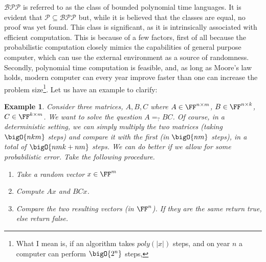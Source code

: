 \documentclass{article}
\newtheorem{example}{Example}
\begin{document}
$\mathcal{BPP}$ is referred to as the class of bounded polynomial time languages. It is evident that $\mathcal{P} \subseteq \mathcal{BPP}$ but, while it is believed that the classes are equal, no proof was yet found. This class is significant, as it is intrinsically associated with efficient computation. This is because of a few factors, first of all because the probabilistic computation closely mimics the capabilities of general purpose computer, which can use the external environment as a source of randomness. Secondly, polynomial time computation is feasible, and, as long as Moore's law holds, modern computer can every year improve faster than one can increase the problem size\footnote{What I mean is, if an algorithm takes $poly(|x|)$ steps, and on year $n$ a computer can perform $\bigO{2^n}$ steps, }. Let us have an example to clarify:
\begin{example}
Consider three matrices, $A, B, C$ where $A \in \FF^{n \times m}$, $B \in \FF^{n \times k}$, $C \in \FF^{k \times m}$. We want to solve the question $A =_? B C$. Of course, in a deterministic setting, we can simply multiply the two matrices (taking $\bigO{nkm}$ steps) and compare it with the first (in $\bigO{nm}$ steps), in a total of $\bigO{nmk + nm}$ steps. We can do better if we allow for some probabilistic error. Take the following procedure.
\begin{enumerate}
    \item Take a random vector $x \in \FF^m$
    \item Compute $Ax$ and $BCx$.
    \item Compare the two resulting vectors (in $\FF^n$). If they are the same return true, else return false. 
\end{enumerate}

\end{example}
\end{document}
